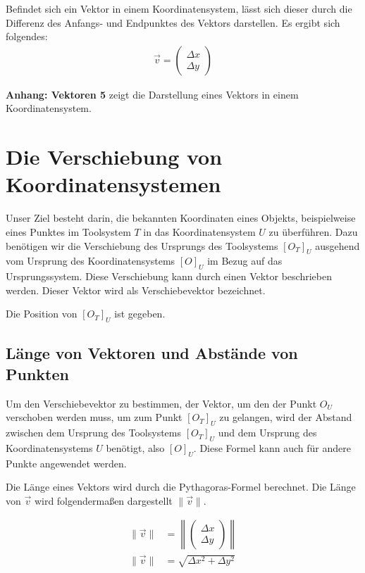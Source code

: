\documentclass{article}
\newcommand{\m}[1]{\begin{pmatrix}#1\end{pmatrix}}
\begin{document}
    Befindet sich ein Vektor in einem Koordinatensystem, lässt sich dieser durch die Differenz
    des Anfangs- und Endpunktes des Vektors darstellen.
    Es ergibt sich folgendes: 
    \[
        \begin{split}
            \vec{v} = \m{\Delta{x} \\ \Delta{y}}
        \end{split}
    \]

    \textbf{Anhang: Vektoren 5} zeigt die Darstellung eines Vektors in einem Koordinatensystem.
    

    \section{Die Verschiebung von Koordinatensystemen}
    
    Unser Ziel besteht darin, die bekannten Koordinaten eines Objekts, beispielweise eines Punktes
    im Toolsystem $T$ in das Koordinatensystem $U$ zu überführen.
    Dazu benötigen wir die Verschiebung des Ursprungs des Toolsystems ${[{O}_{T}]}_{U}$ ausgehend vom 
    Ursprung des Koordinatensystems ${[O]}_{U}$ im Bezug auf das Ursprungssystem.
    Diese Verschiebung kann durch einen Vektor beschrieben werden.
    Dieser Vektor wird als Verschiebevektor bezeichnet.


    Die Position von ${[{O}_{T}]}_{U}$ ist gegeben.

    \subsection{Länge von Vektoren und Abstände von Punkten}
    Um den Verschiebevektor zu bestimmen, der Vektor, um den der Punkt $O_U$ verschoben werden muss,
    um zum Punkt ${[{O}_{T}]}_{U}$ zu gelangen, 
    wird der Abstand zwischen dem Ursprung
    des Toolsystems ${[{O}_{T}]}_{U}$ und dem Ursprung des Koordinatensystems $U$ benötigt,
    also ${[O]}_{U}$. Diese Formel kann auch für andere Punkte angewendet werden.
    
    Die Länge eines Vektors wird durch die Pythagoras-Formel berechnet.
    Die Länge von $\vec{v}$ wird folgendermaßen dargestellt $\lVert \vec{v} \rVert$. 
    

    \[
        \begin{split}
            \lVert \vec{v} \rVert &= \left \lVert \m{\Delta x \\ \Delta y} \right \rVert \\
            \lVert \vec{v} \rVert &= \sqrt{\Delta{x}^2 + \Delta{y}^2}
        \end{split}
    \]
\end{document}

